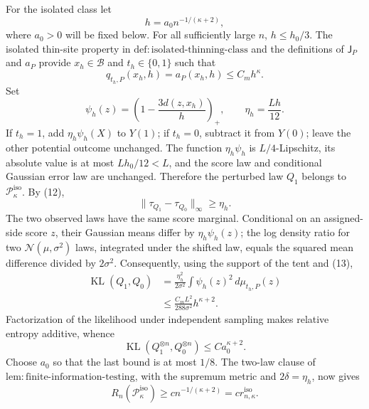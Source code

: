 For the isolated class let
\[
 h=a_0n^{-1/(\kappa+2)},
\]
where \(a_0>0\) will be fixed below.  For all sufficiently large \(n\), \(h\le h_0/3\).  The isolated thin-site property in \(\mathrm{def:isolated\text{-}thinning\text{-}class}\) and the definitions of \(\mathsf J_P\) and \(a_P\) provide \(x_h\in\mathcal B\) and \(t_h\in\{0,1\}\) such that
\[
 q_{t_h,P}(x_h,h)=a_P(x_h,h)\le C_mh^{\kappa}. \tag{13}
\]
Set
\[
 \psi_h(z)=\left(1-\frac{3d(z,x_h)}h\right)_+,
 \qquad \eta_h=\frac{Lh}{12}.
\]
If \(t_h=1\), add \(\eta_h\psi_h(X)\) to \(Y(1)\); if \(t_h=0\), subtract it from \(Y(0)\); leave the other potential outcome unchanged.  The function \(\eta_h\psi_h\) is \(L/4\)-Lipschitz, its absolute value is at most \(Lh_0/12<L\), and the score law and conditional Gaussian error law are unchanged.  Therefore the perturbed law \(Q_1\) belongs to \(\mathcal P_{\kappa}^{\mathrm{iso}}\).  By (12),
\[
 \lVert\tau_{Q_1}-\tau_{Q_0}\rVert_{\infty}\ge\eta_h. \tag{14}
\]
The two observed laws have the same score marginal.  Conditional on an assigned-side score \(z\), their Gaussian means differ by \(\eta_h\psi_h(z)\); the log density ratio for two \(\mathcal N(\mu,\sigma^2)\) laws, integrated under the shifted law, equals the squared mean difference divided by \(2\sigma^2\).  Consequently, using the support of the tent and (13),
\[
 \begin{aligned}
 \operatorname{KL}(Q_1,Q_0)
 &=\frac{\eta_h^2}{2\sigma^2}
   \int\psi_h(z)^2\,d\mu_{t_h,P}(z)\\
 &\le\frac{C_mL^2}{288\sigma^2}h^{\kappa+2}. 
 \end{aligned} \tag{15}
\]
Factorization of the likelihood under independent sampling makes relative entropy additive, whence
\[
 \operatorname{KL}(Q_1^{\otimes n},Q_0^{\otimes n})
 \le C a_0^{\kappa+2}.
\]
Choose \(a_0\) so that the last bound is at most \(1/8\).  The two-law clause of \(\mathrm{lem:finite\text{-}information\text{-}testing}\), with the supremum metric and \(2\delta=\eta_h\), now gives
\[
 R_n(\mathcal P_{\kappa}^{\mathrm{iso}})
 \ge c n^{-1/(\kappa+2)}
 =c r_{n,\kappa}^{\mathrm{iso}}. \tag{16}
\]

